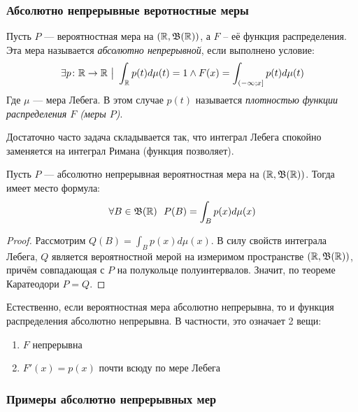 \subsubsection{Абсолютно непрерывные веротностные меры}

\begin{definition}
	Пусть $P$ --- вероятностная мера на $(\mathbb{R}, \mathfrak{B}(\mathbb{R}))$, а $F$ -- её функция распределения. Эта мера называется \textit{абсолютно непрерывной}, если выполнено условие:
	\[
		\exists p \colon \mathbb{R} \to \mathbb{R} \ \big|\  \int_{\mathbb{R}} p(t)d\mu(t) = 1 \wedge F(x) = \int_{\left(-\infty; x\right]} p(t)d\mu(t)
	\]
	Где $\mu$ --- мера Лебега. В этом случае $p(t)$ называется \textit{плотностью функции распределения $F$ (меры $P$)}.
\end{definition}

\begin{note}
	Достаточно часто задача складывается так, что интеграл Лебега спокойно заменяется на интеграл Римана (функция позволяет).
\end{note}

\begin{proposition}
	Пусть $P$ --- абсолютно непрерывная вероятностная мера на $(\mathbb{R}, \mathfrak{B}(\mathbb{R}))$. Тогда имеет место формула:
	\[
		\forall B \in \mathfrak{B}(\mathbb{R})\ \ P(B) = \int_B p(x)d\mu(x)
	\]
\end{proposition}

\begin{proof}
	Рассмотрим $Q(B) = \int_B p(x)d\mu(x)$. В силу свойств интеграла Лебега, $Q$ является вероятностной мерой на измеримом пространстве $(\mathbb{R}, \mathfrak{B}(\mathbb{R}))$, причём совпадающая с $P$ на полукольце полуинтервалов. Значит, по теореме Каратеодори $P = Q$.
\end{proof}

\begin{note}
	Естественно, если вероятностная мера абсолютно непрерывна, то и функция распределения абсолютно непрерывна. В частности, это означает 2 вещи:
	\begin{enumerate}
		\item $F$ непрерывна
		
		\item $F'(x) = p(x)$ почти всюду по мере Лебега
	\end{enumerate}
\end{note}

\subsubsection*{Примеры абсолютно непрерывных мер}

